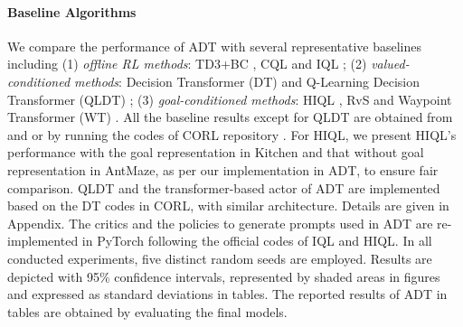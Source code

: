 \paragraph{Baseline Algorithms}
We compare the performance of ADT with several representative baselines including (1) \emph{offline RL methods}:  TD3+BC \citep{fujimoto2021minimalist}, CQL \citep{kumar2020conservative} and IQL \citep{kostrikov2022offline}; (2) \emph{valued-conditioned methods}: Decision Transformer (DT) \citep{chen2021decision} and Q-Learning Decision Transformer (QLDT) \citep{yamagata2023q}; (3) \emph{goal-conditioned methods}: HIQL \citep{park2023hiql}, RvS \citep{emmons2021rvs} and Waypoint Transformer (WT) \citep{badrinath2023waypoint}. All the baseline results except for QLDT are obtained from \citep{badrinath2023waypoint} and \citep{park2023hiql} or by running the codes of CORL repository \citep{tarasov2022corl}. For HIQL, we present HIQL's performance with the goal representation in Kitchen and that without goal  representation in AntMaze, as per our implementation in ADT, to ensure fair comparison. QLDT and the transformer-based actor of ADT are implemented based on the DT codes in CORL, with similar architecture. Details are given in Appendix. The critics and the policies to generate prompts used in ADT are re-implemented in PyTorch following the official codes of IQL and HIQL. In all conducted experiments, five distinct random seeds are employed. Results are depicted with 95\% confidence intervals, represented by shaded areas in figures and expressed as standard deviations in tables. The reported results of ADT in tables are obtained by evaluating the final models.




